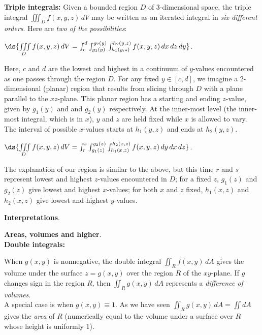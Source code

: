 \documentclass[12pt,fleqn]{article}
\begin{document}
  {\bf Triple integrals:}
  \bq
  Given a bounded region $D$ of 3-dimensional space, the triple integral
  $\iiint_D f(x,y,z)\,dV$ may be written as an iterated integral
  in {\em six different orders}.  Here are {\em two of the possibilities}:
  \bi
  \item
	$\ds{\iiint\limits_D f(x,y,z)\,dV = \int_c^d \int_{g_1(y)}^{g_2(y)}
	  \int_{h_1(y,z)}^{h_2(y,z)} f(x,y,z) \,dx \,dz \,dy}$.
	\bq
	  \begin{minipage}[t]{5.5in}
	  Here, $c$ and $d$ are the lowest and highest in a
	  continuum of $y$-values encountered as one passes
	  through the region $D$.  For any fixed $y \in [c,d]$,
	  we imagine a 2-dimensional (planar) region that results
	  from slicing through $D$ with a plane parallel to the
	  $xz$-plane.  This planar region has a starting and
	  ending $z$-value, given by $g_1(y)$ and and $g_2(y)$
	  respectively.  At the inner-most level (the inner-most
	  integral, which is in $x$), $y$ and $z$ are held fixed
	  while $x$ is allowed to vary.  The interval of possible
	  $x$-values starts at $h_1(y,z)$ and ends at $h_2(y,z)$.
	  \end{minipage}
	\eq
  \item
	$\ds{\iiint\limits_D f(x,y,z)\,dV = \int_r^s \int_{g_1(z)}^{g_2(z)}
	  \int_{h_1(x,z)}^{h_2(x,z)} f(x,y,z) \,dy \,dx \,dz}$.
	\bq
	  \begin{minipage}[t]{5.5in}
	  The explanation of our region is similar to the above,
	  but this time $r$ and $s$ represent lowest and highest
	  $z$-values encountered in $D$; for a fixed $z$,
	  $g_1(z)$ and $g_2(z)$ give lowest and highest $x$-values;
	  for both $x$ and $z$ fixed, $h_1(x,z)$ and $h_2(x,z)$
	  give lowest and highest $y$-values.
	  \end{minipage}
	\eq
  \ei
  \eq

\item {\bf Interpretations}.
  \be
  \item {\bf Areas, volumes and higher}.\\[10pt]
	{\bf Double integrals:}
	\bq
	\begin{minipage}[t]{5.5in}
	When $g(x,y)$ is nonnegative, the double integral
	$\iint_R f(x,y)\,dA$ gives the volume under the surface
	$z = g(x,y)$ over the region $R$ of the $xy$-plane.
	If $g$ changes sign in the region $R$, then $\iint_R
	g(x,y)\,dA$ represents a {\em difference of volumes}.\\[10pt]
	A special case is when $g(x,y) \equiv 1$.
	As we have seen $\iint_R g(x,y)\,dA = \iint dA$ gives
	the {\em area} of $R$ (numerically equal to the volume
	under a surface over $R$ whose height is uniformly 1).
	\end{minipage}
	\eq
\end{document}

